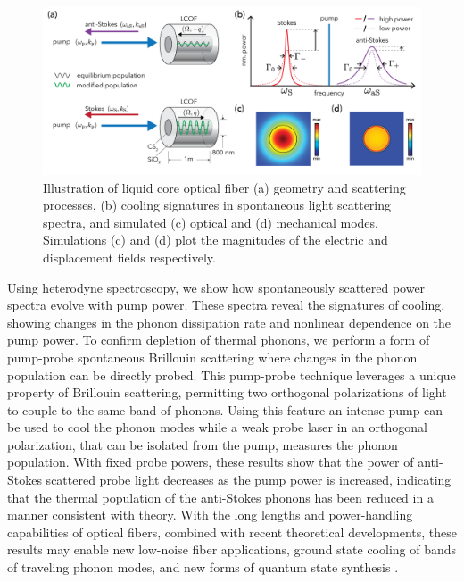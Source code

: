 \begin{figure}[t]
    \centering
    \includegraphics[width=\textwidth]{figs/2-Cooling/introFig_Cooling_v3-01.png}
    \caption{Illustration of liquid core optical fiber (a) geometry and scattering processes, (b) cooling signatures in spontaneous light scattering spectra, and simulated (c) optical and (d) mechanical modes. Simulations (c) and (d) plot the magnitudes of the electric and displacement fields respectively.}
    \label{fig:system}
\end{figure}

Using heterodyne spectroscopy, we show how spontaneously scattered power spectra evolve with pump power. These spectra reveal the signatures of cooling, showing changes in the phonon dissipation rate and nonlinear dependence on the pump power. To confirm depletion of thermal phonons, we perform a form of pump-probe spontaneous Brillouin scattering where changes in the phonon population can be directly probed. This pump-probe technique leverages a unique property of Brillouin scattering, permitting two orthogonal polarizations of light to couple to the same band of phonons. Using this feature an intense pump can be used to cool the phonon modes while a weak probe laser in an orthogonal polarization, that can be isolated from the pump, measures the phonon population. With fixed probe powers, these results show that the power of anti-Stokes scattered probe light decreases as the pump power is increased, indicating that the thermal population of the anti-Stokes phonons has been reduced in a manner consistent with theory. With the long lengths and power-handling capabilities of optical fibers, combined with recent theoretical developments, these results may enable new low-noise fiber applications, ground state cooling of bands of traveling phonon modes, and new forms of quantum state synthesis \cite{zhu2022dynamic,behunin2022quantum}.

